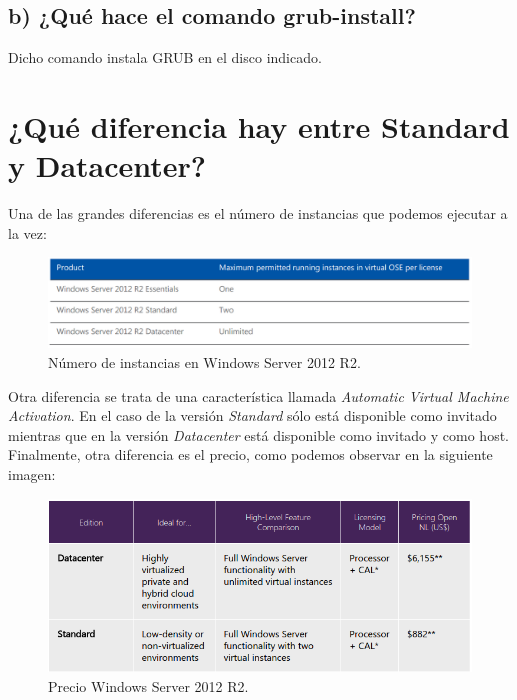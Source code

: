 \documentclass[a4paper,titlepage,12pt]{scrartcl}	%
\numberwithin{figure}{section} %
\numberwithin{table}{section} %
\begin{document}
	
	\subsection[b) ¿Qué hace el comando grub-install?]{b) ¿Qué hace el comando grub-install?}
	
	Dicho comando instala GRUB en el disco indicado. \cite{grubinstall}
		
	\section[¿Qué diferencia hay entre Standard y Datacenter?]{¿Qué diferencia hay entre Standard y Datacenter?}
	
	Una de las grandes diferencias es el número de instancias que podemos ejecutar a la vez: \cite{instanciasWS2012}
	
	\begin{figure}[H]
		\centering
		\includegraphics[width=\linewidth]{./Imagenes/instanciasWS2012.png}
		\caption[Número de instancias en Windows Server 2012 R2.]{Número de instancias en Windows Server 2012 R2.}
	\end{figure}
	
	Otra diferencia se trata de una característica llamada \textit{Automatic Virtual Machine Activation}. En el caso de la versión \textit{Standard} sólo está disponible como invitado mientras que en la versión \textit{Datacenter} está disponible como invitado y como host. \cite{standardVSdataventer} \\
	
	Finalmente, otra diferencia es el precio, como podemos observar en la siguiente imagen: \cite{precioWS2012}
	
	\begin{figure}[H]
		\centering
		\includegraphics[width=\linewidth]{./Imagenes/precioWS2012.png}
		\caption[Precio Windows Server 2012 R2.]{Precio Windows Server 2012 R2.}
	\end{figure}
	
\end{document}
